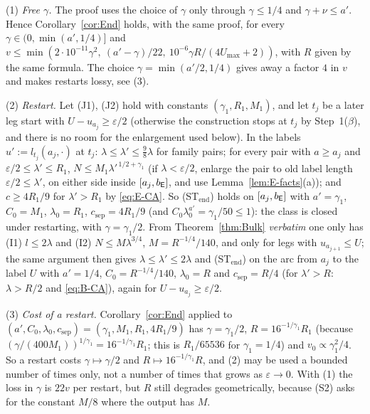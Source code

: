 \begin{remark}\label{rem:E-restart}
(1) \emph{Free $\gamma$.} The proof uses the choice of $\gamma$ only through $\gamma\le1/4$ and $\gamma+\nu\le a'$. Hence
Corollary~\ref{cor:End} holds, with the same proof, for every $\gamma\in(0,\min(a',1/4)]$ and
$v\le\min(2\cdot10^{-11}\gamma^2,\ (a'-\gamma)/22,\ 10^{-6}\gamma R/(4U_{\max}+2))$, with $R$ given by the same formula. The choice
$\gamma=\min(a'/2,1/4)$ gives away a factor $4$ in $v$ and makes restarts lossy, see (3).

(2) \emph{Restart.} Let (J1), (J2) hold with constants $(\gamma_1,R_1,M_1)$, and let $t_j$ be a later leg start with
$U-u_{a_j}\ge\varepsilon/2$ (otherwise the construction stops at $t_j$ by Step~1($\beta$), and there is no room for the enlargement
used below). In the labels $u':=l_{t_j}(a_j,\cdot)$ at $t_j$: $\lambda\le\lambda'\le\frac98\lambda$ for family pairs; for every pair
with $a\ge a_j$ and $\varepsilon/2\le\lambda'\le R_1$, $N\le M_1\lambda'^{\,1/2+\gamma_1}$ (if $\lambda<\varepsilon/2$, enlarge the
pair to old label length $\varepsilon/2\le\lambda'$, on either side inside $[a_j,b_{\mathsf E}]$, and use Lemma~\ref{lem:E-facts}(a)); and
$c\ge4R_1/9$ for $\lambda'>R_1$ by \eqref{eq:E-CA}. So \textup{(ST$_{\mathrm{end}}$)} holds on $[a_j,b_{\mathsf E}]$ with $a'=\gamma_1$,
$C_0=M_1$, $\lambda_0=R_1$, $c_{\mathrm{sep}}=4R_1/9$ (and $C_0\lambda_0^{a'}=\gamma_1/50\le1$): the class is closed under
restarting, with $\gamma=\gamma_1/2$. From Theorem~\ref{thm:Bulk} \emph{verbatim} one only has (I1) $l\le2\lambda$ and (I2)
$N\le M\lambda^{3/4}$, $M=R^{-1/4}/140$, and only for legs with $u_{a_{j+1}}\le U$; the same argument then gives
$\lambda\le\lambda'\le2\lambda$ and \textup{(ST$_{\mathrm{end}}$)} on the arc from $a_j$ to the label $U$ with $a'=1/4$,
$C_0=R^{-1/4}/140$, $\lambda_0=R$ and $c_{\mathrm{sep}}=R/4$ (for $\lambda'>R$: $\lambda>R/2$ and \eqref{eq:B-CA}), again for
$U-u_{a_j}\ge\varepsilon/2$.

(3) \emph{Cost of a restart.} Corollary~\ref{cor:End} applied to $(a',C_0,\lambda_0,c_{\mathrm{sep}})=(\gamma_1,M_1,R_1,4R_1/9)$
has $\gamma=\gamma_1/2$, $R=16^{-1/\gamma_1}R_1$ (because $(\gamma/(400M_1))^{1/\gamma_1}=16^{-1/\gamma_1}R_1$; this is $R_1/65536$
for $\gamma_1=1/4$) and $v_0\propto\gamma_1^2/4$. So a restart costs $\gamma\mapsto\gamma/2$ and $R\mapsto16^{-1/\gamma_1}R$, and
(2) may be used a bounded number of times only, not a number of times that grows as $\varepsilon\to0$. With (1) the loss in
$\gamma$ is $22v$ per restart, but $R$ still degrades geometrically, because (S2) asks for the constant $M/8$ where the output has
$M$.
\end{remark}

